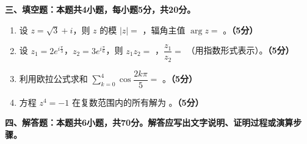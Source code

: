 \documentclass[12pt, a4paper]{ctexart}
\newcommand{\score}[1]{\hfill\textbf{（#1分）}}
\begin{document}
\vspace{10pt}

{\large\bfseries 三、填空题：本题共4小题，每小题5分，共20分。}

\vspace{8pt}

\begin{enumerate}[resume]

\item 设 $z=\sqrt{3}+i$，则 $z$ 的模 $|z|=$ \underline{\hspace{2cm}}，辐角主值 $\arg z=$ \underline{\hspace{2cm}}。\score{5}

\item 设 $z_1=2e^{i\frac{\pi}{3}}$，$z_2=3e^{i\frac{\pi}{6}}$，则 $z_1z_2=$ \underline{\hspace{2cm}}，$\dfrac{z_1}{z_2}=$ \underline{\hspace{2cm}}（用指数形式表示）。\score{5}

\item 利用欧拉公式求和 $\displaystyle\sum_{k=0}^{4}\cos\dfrac{2k\pi}{5}=$ \underline{\hspace{2cm}}。\score{5}

\item 方程 $z^4=-1$ 在复数范围内的所有解为 \underline{\hspace{2cm}}。\score{5}

\end{enumerate}

\vspace{10pt}

{\large\bfseries 四、解答题：本题共6小题，共70分。解答应写出文字说明、证明过程或演算步骤。}

\vspace{8pt}
\end{document}
